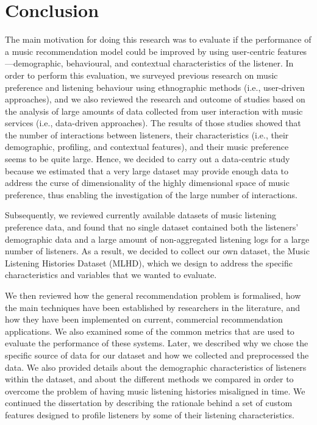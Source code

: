 
\chapter{Conclusion}\label{Ch7-Conclusion}
The main motivation for doing this research was to evaluate if the performance of a music recommendation model could be improved by using user-centric features---demographic, behavioural, and contextual characteristics of the listener. 
In order to perform this evaluation, we surveyed previous research on music preference and listening behaviour using ethnographic methods (i.e., user-driven approaches), and we also reviewed the research and outcome of studies based on the analysis of large amounts of data collected from user interaction with music services (i.e., data-driven approaches). 
The results of those studies showed that the number of interactions between listeners, their characteristics (i.e., their demographic, profiling, and contextual features), and their music preference seems to be quite large. 
Hence, we decided to carry out a data-centric study because we estimated that a very large dataset may provide enough data to address the curse of dimensionality of the highly dimensional space of music preference, thus enabling the investigation of the large number of interactions.



Subsequently, we reviewed currently available datasets of music listening preference data, and found that no single dataset contained both the listeners' demographic data and a large amount of non-aggregated listening logs for a large number of listeners. As a result, we decided to collect our own dataset, the Music Listening Histories Dataset (MLHD), which we design to address the specific characteristics and variables that we wanted to evaluate.

We then reviewed how the general recommendation problem is formal\-ised, how the main techniques have been established by researchers in the literature, and how they have been implemented on current, commercial recommendation applications. We also examined some of the common metrics that are used to evaluate the performance of these systems.
Later, we described why we chose the specific source of data for our dataset and how we collected and preprocessed the data. We also provided details about the demographic characteristics of listeners within the dataset, 
and about the different methods we compared in order to overcome the problem of having music listening histories misaligned in time. 
We continued the dissertation by describing the rationale behind a set of custom features designed to profile listeners by some of their listening characteristics.

